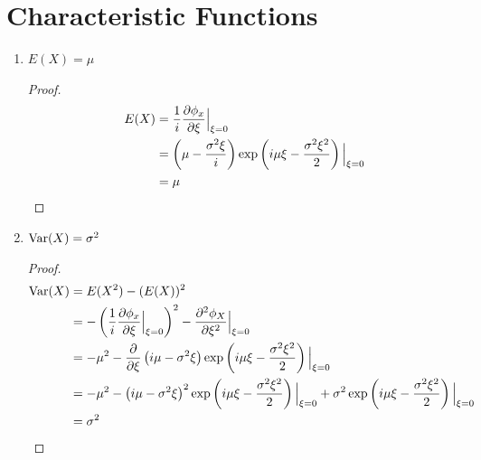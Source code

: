 \documentclass{article}
\begin{document}
\section{Characteristic Functions}
    \begin{enumerate}[label=\roman*)]
        \item $E(X) = \mu$
            \begin{proof}
                \begin{align*}
                    E(X) &= \frac{1}{i}\frac{\partial \phi_x}{\partial \xi}\Big|_{\xi = 0}\\
                    &= \left(\mu - \frac{\sigma^2\xi}{i}\right)\exp\left(i\mu\xi -
                    \frac{\sigma^2\xi^2}{2}\right)\Big|_{\xi = 0}\\
                    &= \mu
                \end{align*}
            \end{proof}
        \item $\text{Var}(X) = \sigma^2$
            \begin{proof}
                \begin{align*}
                    \text{Var}(X) &= E(X^2) - (E(X))^2\\
                    &= - \left(\frac{1}{i}\frac{\partial \phi_x}{\partial \xi}\Big|_{\xi = 0}\right)^2
                    - \frac{\partial^2 \phi_X}{\partial \xi^2}\Big|_{\xi = 0}\\
                    &= -\mu^2 - \frac{\partial}{\partial \xi}\left(i\mu -
                    \sigma^2\xi\right)\exp\left(i\mu\xi -
                    \frac{\sigma^2\xi^2}{2}\right)\Big|_{\xi = 0}\\
                    &= -\mu^2 - \left(i\mu -
                    \sigma^2\xi\right)^2\exp\left(i\mu\xi -
                    \frac{\sigma^2\xi^2}{2}\right)\Big|_{\xi = 0} +
                    \sigma^2\exp\left(i\mu\xi -
                    \frac{\sigma^2\xi^2}{2}\right)\Big|_{\xi = 0}\\
                    &= \sigma^2
                \end{align*}
            \end{proof}
    \end{enumerate}
\end{document}
